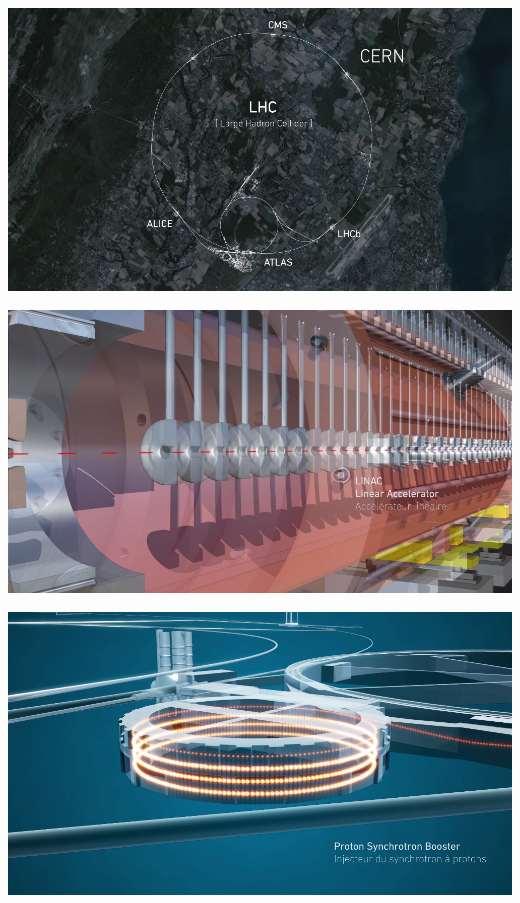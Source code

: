 \documentclass{beamer}
\begin{document}
\begin{frame}
    \includegraphics[width=\textwidth]{video/map.png}
\end{frame}

\begin{frame}
    \includegraphics[width=\textwidth]{video/linac.png}
\end{frame}

\begin{frame}
    \includegraphics[width=\textwidth]{video/psb.png}
\end{frame}
\end{document}
